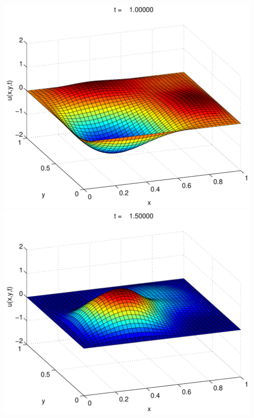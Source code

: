 {\begin{solution}
\begin{enumerate}
\begin{center}
\includegraphics[scale=0.37]{wave2d_3} \quad
\includegraphics[scale=0.37]{wave2d_4} 


\end{center}
\end{enumerate}
\end{solution}}
